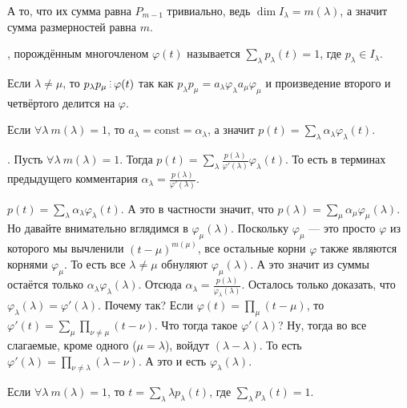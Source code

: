 \documentclass{article}
\begin{document}
\begin{itemize}
\begin{Proof}
            А то, что их сумма равна $P_{m-1}$ тривиально, ведь $\dim I_\lambda=m(\lambda)$, а значит сумма размерностей равна $m$.
        \end{Proof}
        \dfn {}, порождённым многочленом $\varphi(t)$ называется $\sum\limits_\lambda p_\lambda(t)=1$, где $p_\lambda\in I_\lambda$.
        \begin{Comment}
            Если $\lambda\neq\mu$, то $p_\lambda p_\mu\divby\varphi(t)$ так как $p_\lambda p_\mu=a_\lambda\varphi_\lambda a_\mu\varphi_\mu$ и произведение второго и четвёртого делится на $\varphi$.
        \end{Comment}
        \begin{Comment}
            Если $\forall\lambda~m(\lambda)=1$, то $a_\lambda=\mathrm{const}=\alpha_\lambda$, а значит $p(t)=\sum\limits_\lambda\alpha_\lambda\varphi_\lambda(t)$.
        \end{Comment}
        \thm {}. Пусть $\forall\lambda~m(\lambda)=1$. Тогда $p(t)=\sum\limits_\lambda\frac{p(\lambda)}{\varphi'(\lambda)}\varphi_\lambda(t)$. То есть в терминах предыдущего комментария $\alpha_\lambda=\frac{p(\lambda)}{\varphi'(\lambda)}$.
        \begin{Proof}
            $p(t)=\sum\limits_\lambda\alpha_\lambda\varphi_\lambda(t)$. А это в частности значит, что $p(\lambda)=\sum\limits_\mu\alpha_\mu\varphi_\mu(\lambda)$. Но давайте внимательно вглядимся в $\varphi_\mu(\lambda)$. Поскольку $\varphi_\mu$ --- это просто $\varphi$ из которого мы вычленили $(t-\mu)^{m(\mu)}$, все остальные корни $\varphi$ также являются корнями $\varphi_\mu$. То есть все $\lambda\neq\mu$ обнуляют $\varphi_\mu(\lambda)$. А это значит из суммы остаётся только $\alpha_\lambda\varphi_\lambda(\lambda)$. Отсюда $\alpha_\lambda=\frac{p(\lambda)}{\varphi_\lambda(\lambda)}$. Осталось только доказать, что $\varphi_\lambda(\lambda)=\varphi'(\lambda)$. Почему так? Если $\varphi(t)=\prod\limits_\mu(t-\mu)$, то $\varphi'(t)=\sum\limits_\mu\prod\limits_{\nu\neq\mu}(t-\nu)$. Что тогда такое $\varphi'(\lambda)$? Ну, тогда во все слагаемые, кроме одного ($\mu=\lambda$), войдут $(\lambda-\lambda)$. То есть $\varphi'(\lambda)=\prod\limits_{\nu\neq\lambda}(\lambda-\nu)$. А это и есть $\varphi_\lambda(\lambda)$.
        \end{Proof}
        \thm Если $\forall\lambda~m(\lambda)=1$, то $t=\sum\limits_\lambda\lambda p_\lambda(t)$, где $\sum\limits_\lambda p_\lambda(t)=1$.
        \begin{Proof}

\end{Proof}
\end{itemize}
\end{document}
